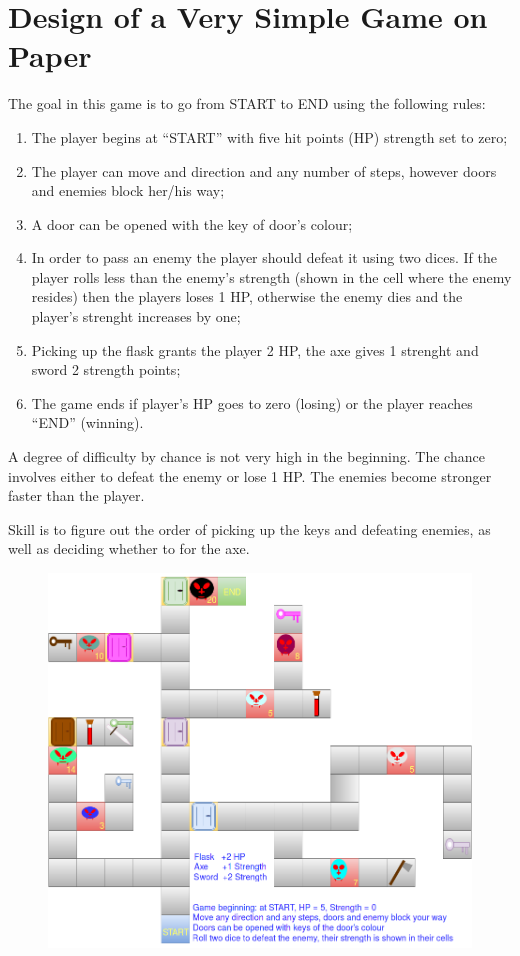 \documentclass{article}
\begin{document}
\thispagestyle{empty}

\section*{Design of a Very Simple Game on Paper}

The goal in this game is to go from START to END using the following rules:

\begin{enumerate}

  \item The player begins at ``START'' with five hit points (HP) strength set to
    zero;

  \item The player can move and direction and any number of steps, however doors
    and enemies block her/his way;

  \item A door can be opened with the key of door's colour;

  \item In order to pass an enemy the player should defeat it using two dices.
    If the player rolls less than the enemy's strength (shown in the cell where
    the enemy resides) then the players loses 1 HP, otherwise the enemy dies
    and the player's strenght increases by one;

  \item Picking up the flask grants the player 2 HP, the axe gives 1 strenght
    and sword 2 strength points;

  \item The game ends if player's HP goes to zero (losing) or the player
    reaches ``END'' (winning).

\end{enumerate}

A degree of difficulty by chance is not very high in the beginning. The chance
involves either to defeat the enemy or lose 1 HP. The enemies become stronger
faster than the player.

Skill is to figure out the order of picking up the keys and defeating enemies,
as well as deciding whether to for the axe.

\begin{figure}[ht]
  \centering
  \includegraphics[width=\textwidth]{simpleGameDesign.png}
\end{figure}
\end{document}
